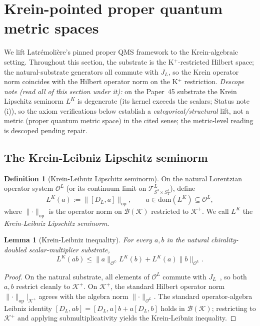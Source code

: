 \documentclass[11pt,a4paper]{article}
\theoremstyle{plain}
\newtheorem{lemma}[theorem]{Lemma}
\theoremstyle{definition}
\newtheorem{definition}[theorem]{Definition}
\newcommand{\Manifold}{S^{3}\times S^{1}_{T}}
\newcommand{\Krein}{\mathcal{K}}
\newcommand{\Op}{\mathcal{O}}
\newcommand{\Tcal}{\mathcal{T}}
\newcommand{\Bcal}{\mathcal{B}}
\newcommand{\opnorm}[1]{\lVert #1 \rVert_{\mathrm{op}}}
\newcommand{\norm}[1]{\lVert #1 \rVert}
\newcommand{\DL}{D_{L}}
\newcommand{\JL}{J_{L}}
\newcommand{\Kplus}{\Krein^{+}}
\begin{document}
\section{Krein-pointed proper quantum metric spaces}\label{sec:krein_ppqms}

We lift Latr\'emoli\`ere's pinned proper QMS framework to the
Krein-algebraic setting. Throughout this section, the substrate is
the K$^{+}$-restricted Hilbert space; the natural-substrate generators
all commute with $\JL$, so the Krein operator norm coincides with the
Hilbert operator norm on the K$^{+}$ restriction.
\emph{Descope note (read all of this section under it):} on the
Paper~45 substrate the Krein Lipschitz seminorm $L^{K}$ is degenerate
(its kernel exceeds the scalars; Status note (i)), so the axiom
verifications below establish a \emph{categorical/structural} lift, not
a metric (proper quantum metric space) in the cited sense; the
metric-level reading is descoped pending repair.

\subsection{The Krein-Leibniz Lipschitz seminorm}\label{sec:krein_leibniz}

\begin{definition}[Krein-Leibniz Lipschitz seminorm]\label{def:krein_leibniz}
On the natural Lorentzian operator system $\Op^{L}$ (or its continuum
limit on $\Tcal^{L}_{\Manifold}$), define
\[
L^{K}(a) := \opnorm{[\DL, a]}, \qquad a \in \mathrm{dom}(L^{K}) \subseteq \Op^{L},
\]
where $\opnorm{\cdot}$ is the operator norm on $\Bcal(\Krein)$
restricted to $\Kplus$. We call $L^{K}$ the \emph{Krein-Leibniz
Lipschitz seminorm}.
\end{definition}

\begin{lemma}[Krein-Leibniz inequality]\label{lem:krein_leibniz}
For every $a, b$ in the natural chirality-doubled scalar-multiplier
substrate,
\[
L^{K}(ab) \le \norm{a}_{\Op^{L}} L^{K}(b) + L^{K}(a) \norm{b}_{\Op^{L}}.
\]
\end{lemma}

\begin{proof}
On the natural substrate, all elements of $\Op^{L}$ commute with
$\JL$~\cite{paper44}, so both $a, b$ restrict cleanly to $\Kplus$.
On $\Kplus$, the standard Hilbert operator norm
$\opnorm{\cdot}|_{\Kplus}$ agrees with the algebra norm
$\norm{\cdot}_{\Op^{L}}$. The standard operator-algebra Leibniz
identity
$[\DL, ab] = [\DL, a] b + a [\DL, b]$ holds in $\Bcal(\Krein)$;
restricting to $\Kplus$ and applying submultiplicativity yields the
Krein-Leibniz inequality.
\end{proof}
\end{document}
